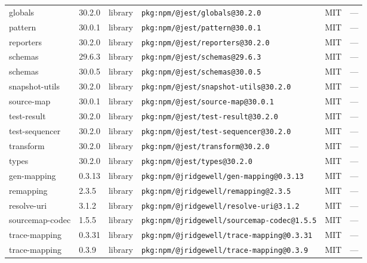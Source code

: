 \documentclass[11pt,a4paper]{article}
\begin{document}
\begin{longtable}{|p{4cm}|p{2cm}|p{1.6cm}|p{5cm}|p{1.5cm}|p{3.5cm}|}
\raggedright globals & 30.2.0 & library & \small\texttt{pkg:npm/@jest/globals@30.2.0} & MIT & \small — \\
\raggedright pattern & 30.0.1 & library & \small\texttt{pkg:npm/@jest/pattern@30.0.1} & MIT & \small — \\
\raggedright reporters & 30.2.0 & library & \small\texttt{pkg:npm/@jest/reporters@30.2.0} & MIT & \small — \\
\raggedright schemas & 29.6.3 & library & \small\texttt{pkg:npm/@jest/schemas@29.6.3} & MIT & \small — \\
\raggedright schemas & 30.0.5 & library & \small\texttt{pkg:npm/@jest/schemas@30.0.5} & MIT & \small — \\
\raggedright snapshot-utils & 30.2.0 & library & \small\texttt{pkg:npm/@jest/snapshot-utils@30.2.0} & MIT & \small — \\
\raggedright source-map & 30.0.1 & library & \small\texttt{pkg:npm/@jest/source-map@30.0.1} & MIT & \small — \\
\raggedright test-result & 30.2.0 & library & \small\texttt{pkg:npm/@jest/test-result@30.2.0} & MIT & \small — \\
\raggedright test-sequencer & 30.2.0 & library & \small\texttt{pkg:npm/@jest/test-sequencer@30.2.0} & MIT & \small — \\
\raggedright transform & 30.2.0 & library & \small\texttt{pkg:npm/@jest/transform@30.2.0} & MIT & \small — \\
\raggedright types & 30.2.0 & library & \small\texttt{pkg:npm/@jest/types@30.2.0} & MIT & \small — \\
\raggedright gen-mapping & 0.3.13 & library & \small\texttt{pkg:npm/@jridgewell/gen-mapping@0.3.13} & MIT & \small — \\
\raggedright remapping & 2.3.5 & library & \small\texttt{pkg:npm/@jridgewell/remapping@2.3.5} & MIT & \small — \\
\raggedright resolve-uri & 3.1.2 & library & \small\texttt{pkg:npm/@jridgewell/resolve-uri@3.1.2} & MIT & \small — \\
\raggedright sourcemap-codec & 1.5.5 & library & \small\texttt{pkg:npm/@jridgewell/sourcemap-codec@1.5.5} & MIT & \small — \\
\raggedright trace-mapping & 0.3.31 & library & \small\texttt{pkg:npm/@jridgewell/trace-mapping@0.3.31} & MIT & \small — \\
\raggedright trace-mapping & 0.3.9 & library & \small\texttt{pkg:npm/@jridgewell/trace-mapping@0.3.9} & MIT & \small — \\

\end{longtable}
\end{document}
